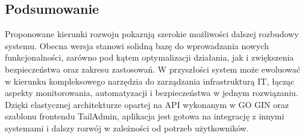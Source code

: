 \subsection{Podsumowanie}
Proponowane kierunki rozwoju pokazują szerokie możliwości dalszej rozbudowy systemu. Obecna wersja stanowi solidną bazę do wprowadzania nowych funkcjonalności, zarówno pod kątem optymalizacji działania, jak i zwiększenia bezpieczeństwa oraz zakresu zastosowań. W przyszłości system może ewoluować w kierunku kompleksowego narzędzia do zarządzania infrastrukturą IT, łącząc aspekty monitorowania, automatyzacji i bezpieczeństwa w jednym rozwiązaniu. Dzięki elastycznej architekturze opartej na API wykonanym w GO GIN oraz szablonu frontendu TailAdmin, aplikacja jest gotowa na integrację z innymi systemami i dalszy rozwój w zależności od potrzeb użytkowników.